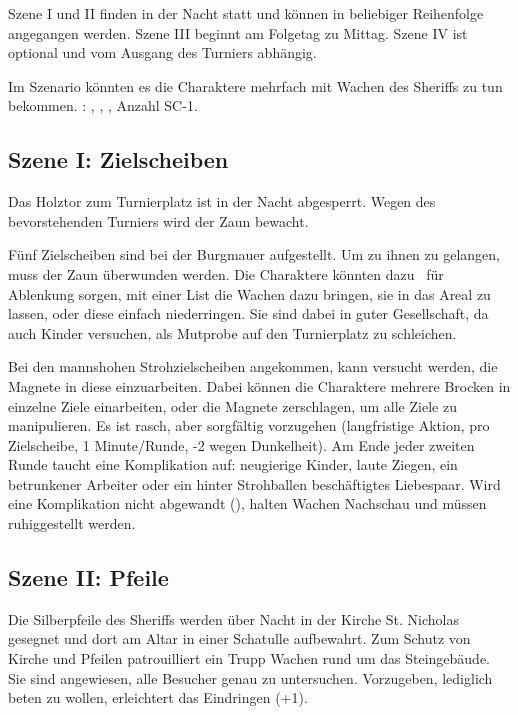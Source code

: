 {	

		\noindent
		Szene I und II finden in der Nacht statt und können in beliebiger Reihenfolge angegangen werden. Szene III beginnt am Folgetag zu Mittag. Szene IV ist optional und vom Ausgang des Turniers abhängig.

		Im Szenario könnten es die Charaktere mehrfach mit Wachen des Sheriffs zu tun bekommen. : , , , Anzahl SC-1.

		\subsection{Szene I: Zielscheiben}

		Das Holztor zum Turnierplatz ist in der Nacht abgesperrt. Wegen des bevorstehenden Turniers wird der Zaun bewacht.

		Fünf Zielscheiben sind bei der Burgmauer aufgestellt. Um zu ihnen zu gelangen, muss der Zaun überwunden werden. Die Charaktere könnten dazu \zB~für Ablenkung sorgen, mit einer List die Wachen dazu bringen, sie in das Areal zu lassen, oder diese einfach niederringen. Sie sind dabei in guter Gesellschaft, da auch Kinder versuchen, als Mutprobe auf den Turnierplatz zu schleichen.

		Bei den mannshohen Strohzielscheiben angekommen, kann versucht werden, die Magnete in diese einzuarbeiten. Dabei können die Charaktere mehrere Brocken in einzelne Ziele einarbeiten, oder die Magnete zerschlagen, um alle Ziele zu manipulieren. Es ist rasch, aber sorgfältig vorzugehen (langfristige Aktion,  pro Zielscheibe, 1 Minute/Runde, -2 wegen Dunkelheit). Am Ende jeder zweiten Runde taucht eine Komplikation auf: neugierige Kinder, laute Ziegen, ein betrunkener Arbeiter oder ein hinter Strohballen beschäftigtes Liebespaar. Wird eine Komplikation nicht abgewandt (), halten Wachen Nachschau und müssen ruhiggestellt werden.

		\subsection{Szene II: Pfeile}

		Die Silberpfeile des Sheriffs werden über Nacht in der Kirche St. Nicholas gesegnet und dort am Altar in einer Schatulle aufbewahrt. Zum Schutz von Kirche und Pfeilen patrouilliert ein Trupp Wachen rund um das Steingebäude. Sie sind angewiesen, alle Besucher genau zu untersuchen. Vorzugeben, lediglich beten zu wollen, erleichtert das Eindringen (+1).

}
